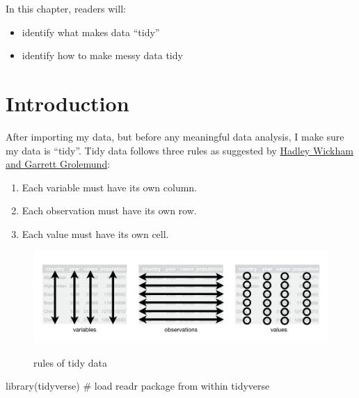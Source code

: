 \documentclass[
  letterpaper,
  DIV=11,
  numbers=noendperiod]{scrreprt}
\newenvironment{Shaded}{\begin{snugshade}}{\end{snugshade}}
\newcommand{\CommentTok}[1]{\textcolor[rgb]{0.37,0.37,0.37}{#1}}
\newcommand{\FunctionTok}[1]{\textcolor[rgb]{0.28,0.35,0.67}{#1}}
\newcommand{\NormalTok}[1]{\textcolor[rgb]{0.00,0.23,0.31}{#1}}
\providecommand{\tightlist}{%
  \setlength{\itemsep}{0pt}\setlength{\parskip}{0pt}}\usepackage{longtable,booktabs,array}
\begin{document}
In this chapter, readers will:

\begin{itemize}
\tightlist
\item
  identify what makes data ``tidy''
\item
  identify how to make messy data tidy
\end{itemize}

\hypertarget{introduction-5}{%
\section{Introduction}\label{introduction-5}}

After importing my data, but before any meaningful data analysis, I make
sure my data is ``tidy''. Tidy data follows three rules as suggested by
\href{https://r4ds.had.co.nz/tidy-data.html}{Hadley Wickham and Garrett
Grolemund}:

\begin{enumerate}
\def\labelenumi{\arabic{enumi}.}
\tightlist
\item
  Each variable must have its own column.
\item
  Each observation must have its own row.
\item
  Each value must have its own cell.
\end{enumerate}

\begin{figure}

{\centering 

\href{https://r4ds.had.co.nz/tidy-data.html}{\includegraphics{./assets/tidy-1.png}}

}

\caption{rules of tidy data}

\end{figure}

\begin{Shaded}
\begin{Highlighting}[]
\FunctionTok{library}\NormalTok{(tidyverse) }\CommentTok{\# load readr package from within tidyverse}
\end{Highlighting}
\end{Shaded}
\end{document}
